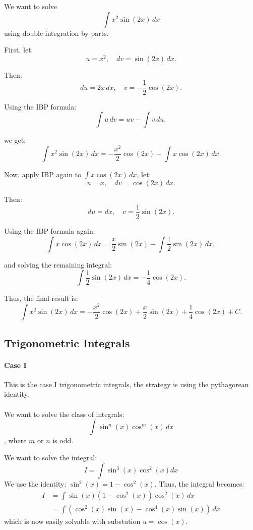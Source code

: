 \documentclass[11pt]{report}
\begin{document}
\begin{example}
We want to solve $$ \int x^2 \sin(2x) \, dx $$ using double integration by parts.

First, let:
$$ u = x^2, \quad dv = \sin(2x) \, dx. $$

Then:
$$ du = 2x \, dx, \quad v = -\frac{1}{2} \cos(2x). $$

Using the IBP formula:
$$ \int u \, dv = uv - \int v \, du, $$

we get:
$$ \int x^2 \sin(2x) \, dx = -\frac{x^2}{2} \cos(2x) + \int x \cos(2x) \, dx. $$

Now, apply IBP again to \( \int x \cos(2x) \, dx \), let:
$$ u = x, \quad dv = \cos(2x) \, dx. $$

Then:
$$ du = dx, \quad v = \frac{1}{2} \sin(2x). $$

Using the IBP formula again:
$$ \int x \cos(2x) \, dx = \frac{x}{2} \sin(2x) - \int \frac{1}{2} \sin(2x) \, dx, $$

and solving the remaining integral:
$$ \int \frac{1}{2} \sin(2x) \, dx = -\frac{1}{4} \cos(2x). $$

Thus, the final result is:
$$ \int x^2 \sin(2x) \, dx = -\frac{x^2}{2} \cos(2x) + \frac{x}{2} \sin(2x) + \frac{1}{4} \cos(2x) + C. $$

\end{example}
\subsection{Trigonometric Integrals}
\paragraph{Case I} This is the case I trigonometric integrals, the strategy is using the pythagorean identity.
\paragraph{} We want to solve the class of integrals:
\begin{equation}
 \int \sin^n(x) \cos^m(x) \, dx
\end{equation}
, where $m$ or $n$ is odd.
\begin{example}
We want to solve the integral:
$$ I = \int \sin^3(x) \cos^2(x) dx $$
We use the identity: $ \sin^2(x) = 1 - \cos^2(x)$. Thus, the integral becomes:
\begin{align*}
    I &= \int \sin(x)(1 - \cos^2(x)) \cos^2(x) \, dx \\
    &= \int (\cos^2(x) \sin(x) - \cos^4(x) \sin(x)) \, dx
\end{align*} 
which is now easily solvable with substution $u=\cos(x)$.
\end{example}
\end{document}
